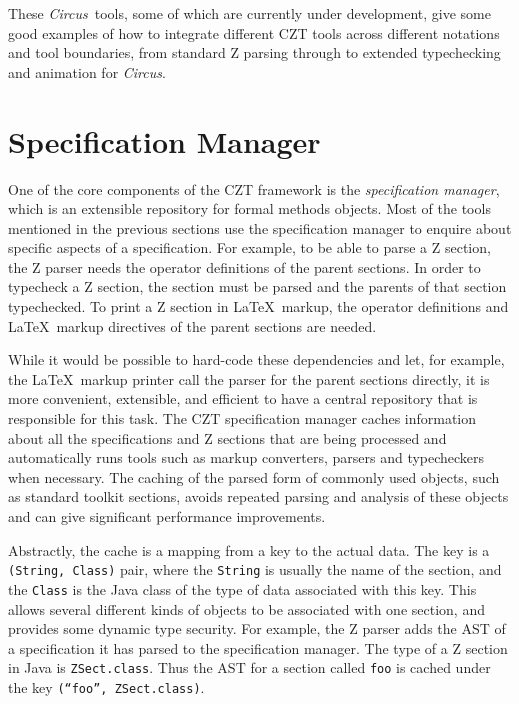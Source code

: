 \documentclass{llncs}
\newcommand{\Circus}{{\sf\slshape Circus}}
\newcommand{\Interface}[1]{\texttt{#1}}
\begin{document}
    These \Circus\ tools, some of which are currently under development,
    give some good examples of how to integrate different CZT
    tools across different notations and tool boundaries, from standard
    Z parsing through to extended typechecking and animation for \Circus.


\section{Specification Manager}
\label{section-manager}

  One of the core components of the CZT framework is the
  \emph{specification manager}, which is an extensible repository for
  formal methods objects.  Most of the tools mentioned in the previous
  sections use the specification manager to enquire about specific
  aspects of a specification.  For example, to be able to parse a Z
  section, the Z parser needs the operator definitions of the parent
  sections.  In order to typecheck a Z section, the section must be
  parsed and the parents of that section typechecked.  To print a Z
  section in \LaTeX\ markup, the operator definitions and \LaTeX\
  markup directives of the parent sections are needed.

  While it would be possible to hard-code these dependencies and let,
  for example, the \LaTeX\ markup printer call the parser for the
  parent sections directly, it is more convenient, extensible, and
  efficient to have a central repository that is responsible for this
  task.  The CZT specification manager caches information about all
  the specifications and Z sections that are being processed and
  automatically runs tools such as markup converters, parsers and
  typecheckers when necessary.  The caching of the parsed form of
  commonly used objects, such as standard toolkit sections, avoids
  repeated parsing and analysis of these objects and can give
  significant performance improvements.

  Abstractly, the cache is a mapping from a key to the actual data.
  The key is a \texttt{(String, Class)} pair, where the \texttt{String} is usually
  the name of the section, and the \texttt{Class} is the Java class of the
  type of data associated with this key.  This allows several
  different kinds of objects to be associated with one section, and
  provides some dynamic type security.  For example, the Z parser adds
  the AST of a specification it has parsed to the specification
  manager.  The type of a Z section in Java is
  \Interface{ZSect.class}. Thus the AST for a section called
  \texttt{foo} is cached under the key
  \texttt{(``foo'',~ZSect.class)}.
\end{document}
